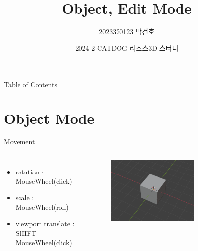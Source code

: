 \documentclass[12pt]{beamer}
\title{Object, Edit Mode}
\author{2023320123 박건호}
\date{2024-2 CATDOG 리소스3D 스터디}
\begin{document}
\maketitle
\begin{frame}{Table of Contents}   
\tableofcontents
\end{frame}

\section{Object Mode}

\begin{frame}{Movement}
    \begin{columns}
            \begin{itemize}
                \item rotation : MouseWheel(click) \newline
                \item scale : MouseWheel(roll) \newline
                \item viewport translate : SHIFT + MouseWheel(click)
            \end{itemize}

            \begin{figure}[t]
            \centering
            \includegraphics[width=0.7\textwidth]{image/screen.png}
            \end{figure}
    \end{columns}
\end{frame}
\end{document}
